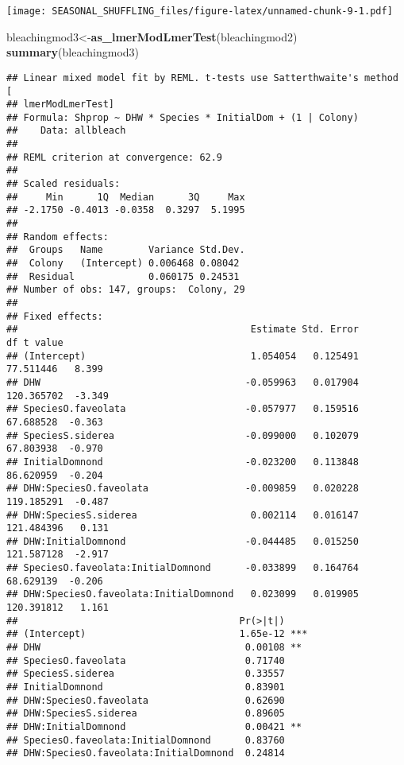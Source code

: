 \documentclass[]{article}
\newenvironment{Shaded}{\begin{snugshade}}{\end{snugshade}}
\newcommand{\KeywordTok}[1]{\textcolor[rgb]{0.13,0.29,0.53}{\textbf{#1}}}
\newcommand{\NormalTok}[1]{#1}
\begin{document}
\texttt{[image: SEASONAL\_SHUFFLING\_files/figure-latex/unnamed-chunk-9-1.pdf]}

\begin{Shaded}
\begin{Highlighting}[]
\NormalTok{bleachingmod3<-}\KeywordTok{as_lmerModLmerTest}\NormalTok{(bleachingmod2)}
  \KeywordTok{summary}\NormalTok{(bleachingmod3)}
\end{Highlighting}
\end{Shaded}

\begin{verbatim}
## Linear mixed model fit by REML. t-tests use Satterthwaite's method [
## lmerModLmerTest]
## Formula: Shprop ~ DHW * Species * InitialDom + (1 | Colony)
##    Data: allbleach
## 
## REML criterion at convergence: 62.9
## 
## Scaled residuals: 
##     Min      1Q  Median      3Q     Max 
## -2.1750 -0.4013 -0.0358  0.3297  5.1995 
## 
## Random effects:
##  Groups   Name        Variance Std.Dev.
##  Colony   (Intercept) 0.006468 0.08042 
##  Residual             0.060175 0.24531 
## Number of obs: 147, groups:  Colony, 29
## 
## Fixed effects:
##                                         Estimate Std. Error         df t value
## (Intercept)                             1.054054   0.125491  77.511446   8.399
## DHW                                    -0.059963   0.017904 120.365702  -3.349
## SpeciesO.faveolata                     -0.057977   0.159516  67.688528  -0.363
## SpeciesS.siderea                       -0.099000   0.102079  67.803938  -0.970
## InitialDomnond                         -0.023200   0.113848  86.620959  -0.204
## DHW:SpeciesO.faveolata                 -0.009859   0.020228 119.185291  -0.487
## DHW:SpeciesS.siderea                    0.002114   0.016147 121.484396   0.131
## DHW:InitialDomnond                     -0.044485   0.015250 121.587128  -2.917
## SpeciesO.faveolata:InitialDomnond      -0.033899   0.164764  68.629139  -0.206
## DHW:SpeciesO.faveolata:InitialDomnond   0.023099   0.019905 120.391812   1.161
##                                       Pr(>|t|)    
## (Intercept)                           1.65e-12 ***
## DHW                                    0.00108 ** 
## SpeciesO.faveolata                     0.71740    
## SpeciesS.siderea                       0.33557    
## InitialDomnond                         0.83901    
## DHW:SpeciesO.faveolata                 0.62690    
## DHW:SpeciesS.siderea                   0.89605    
## DHW:InitialDomnond                     0.00421 ** 
## SpeciesO.faveolata:InitialDomnond      0.83760    
## DHW:SpeciesO.faveolata:InitialDomnond  0.24814    

\end{verbatim}
\end{document}
